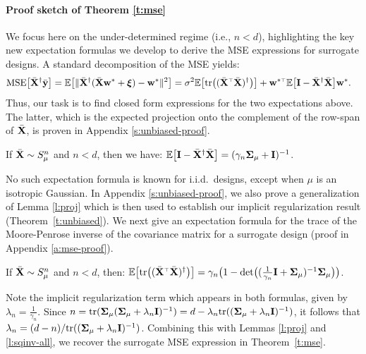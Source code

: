 \documentclass[thesis.tex]{subfiles}
\begin{document}
\paragraph{Proof sketch of Theorem \ref{t:mse}}
We focus here on the under-determined regime (i.e., $n<d$),
highlighting the key new expectation formulas we develop to derive the
MSE expressions for surrogate designs. A standard decomposition of the MSE yields:
\begin{align}
  \MSE{\Xb^\dagger\ybb}
   & = \E\big[\|\Xb^\dagger(\Xb\w^*+\xib)-\w^*\|^2\big]
  =\sigma^2\E\big[\tr\big((\Xb^\top\Xb)^{\dagger}\big)\big] +
  \w^{*\top}\E\big[\I-\Xb^\dagger\Xb\big]\w^*.\label{eq:mse-derivation}
\end{align}
Thus, our task is to find closed form expressions for the two
expectations above. The latter, which is the expected projection onto
the complement of the row-span of ${\bar{\mathbf X}}$, is proven in
Appendix \ref{s:unbiased-proof}.
\begin{lemma}\label{l:proj}
  If  ${\bar{\mathbf X}}\sim S_\mu^n$ and $n<d$, then we have:
  $\mathbb E\big[\mathbf I-{\bar{\mathbf X}}^\dagger{\bar{\mathbf X}}\big] = (\gamma_n\mathbf{\Sigma}_\mu+\mathbf I)^{-1}$.
\end{lemma}

\noindent
No such expectation formula is known for i.i.d.~designs, except when
$\mu$ is an isotropic Gaussian. In Appendix \ref{s:unbiased-proof}, we
also prove a generalization of Lemma \ref{l:proj} which is then used
to establish our implicit regularization result
(Theorem~\ref{t:unbiased}). We next give an expectation formula
for the trace of the Moore-Penrose inverse of the covariance
matrix for a surrogate design (proof in Appendix \ref{a:mse-proof}).
\begin{lemma}\label{l:sqinv-all}
  If  ${\bar{\mathbf X}}\sim S_\mu^n$ and $n<d$, then:
  $\E\big[\tr\big((\Xb^\top\Xb)^{\dagger}\big)\big]
    =\gamma_n\big(1-
    \det\!\big((\tfrac1{\gamma_n}\I+\Sigmab_\mu)^{-1}\Sigmab_\mu\big)\big)$.
\end{lemma}

\noindent
Note the implicit regularization term which appears in both formulas,
given by $\lambda_n=\frac1{\gamma_n}$. Since $n =
  \mathrm{tr}(\mathbf{\Sigma}_\mu(\mathbf{\Sigma}_\mu+\lambda_n\mathbf I)^{-1})=d-\lambda_n\mathrm{tr}((\mathbf{\Sigma}_\mu+\lambda_n\mathbf I)^{-1})$,
it follows that $\lambda_n=(d-n)/\mathrm{tr}((\mathbf{\Sigma}_\mu+\lambda_n\mathbf I)^{-1})$.
Combining this with Lemmas \ref{l:proj} and \ref{l:sqinv-all}, we
recover the surrogate MSE expression in Theorem~\ref{t:mse}.
\end{document}
